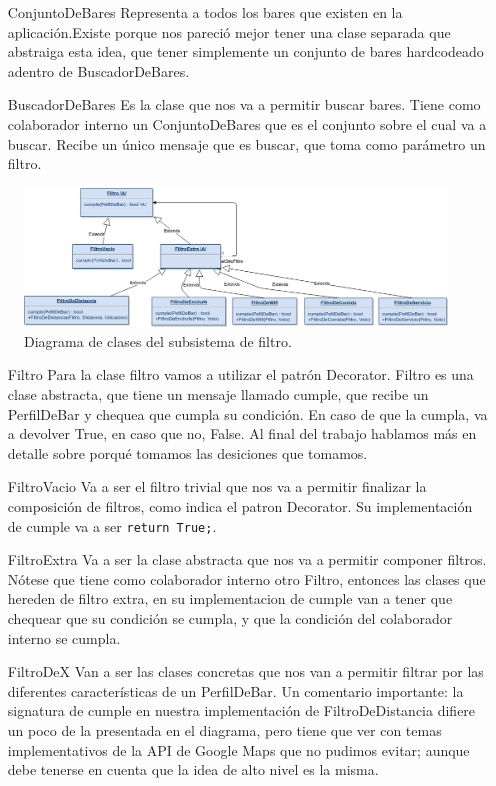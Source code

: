 \begin{itemize}
\item[ConjuntoDeBares] Representa a todos los bares que existen en la aplicación.Existe porque nos pareció mejor tener una clase separada que abstraiga esta idea, que tener simplemente un conjunto de bares hardcodeado adentro de BuscadorDeBares.

\item[BuscadorDeBares] Es la clase que nos va a permitir buscar bares. Tiene como colaborador interno un ConjuntoDeBares que es el conjunto sobre el cual va a buscar. Recibe un único mensaje que es buscar, que toma como parámetro un filtro.
\end{itemize}


\begin{figure}[H]
  \centering
  \includegraphics[width=\textwidth]{diagramas/filtro_clases.png}
  \caption{\normalfont Diagrama de clases del subsistema de filtro.}
\end{figure}

\begin{itemize}
\item[Filtro] Para la clase filtro vamos a utilizar el patrón Decorator. Filtro es una clase abstracta, que tiene un mensaje llamado cumple, que recibe un PerfilDeBar y chequea que cumpla su condición. En caso de que la cumpla, va a devolver True, en caso que no, False. Al final del trabajo hablamos más en detalle sobre porqu\'e tomamos las desiciones que tomamos.

\item[FiltroVacio] Va a ser el filtro trivial que nos va a permitir finalizar la composición de filtros, como indica el patron Decorator. Su implementación de cumple va a ser \texttt{return True;}.

\item[FiltroExtra] Va a ser la clase abstracta que nos va a permitir componer filtros. Nótese que tiene como colaborador interno otro Filtro, entonces las clases que hereden de filtro extra, en su implementacion de cumple van a tener que chequear que su condición se cumpla, y que la condición del colaborador interno se cumpla.

\item[FiltroDeX] Van a ser las clases concretas que nos van a permitir filtrar por las diferentes características de un PerfilDeBar. Un comentario importante: la signatura de cumple en nuestra implementación de FiltroDeDistancia difiere un poco de la presentada en el diagrama, pero tiene que ver con temas implementativos de la API de Google Maps que no pudimos evitar; aunque debe tenerse en cuenta que la idea de alto nivel es la misma.
\end{itemize}

